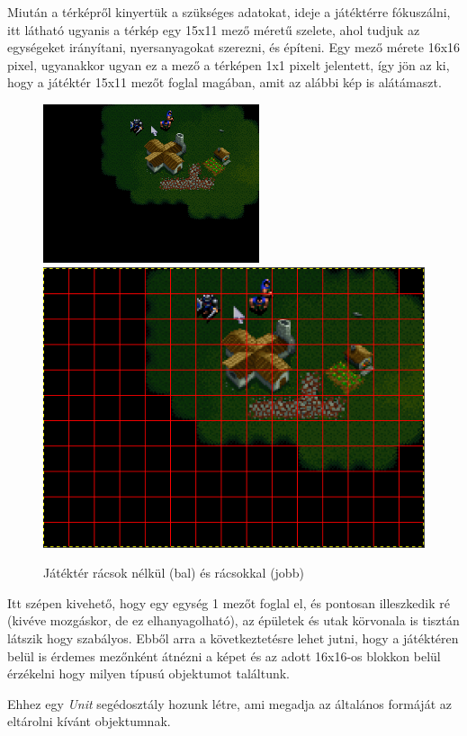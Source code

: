 Miután a térképről kinyertük a szükséges adatokat, ideje a játéktérre fókuszálni, itt látható ugyanis a térkép egy 15x11 mező méretű szelete, ahol tudjuk az egységeket irányítani, nyersanyagokat szerezni, és építeni.
Egy mező mérete 16x16 pixel, ugyanakkor ugyan ez a mező a térképen 1x1 pixelt jelentett, így jön az ki, hogy a játéktér 15x11 mezőt foglal magában, amit az alábbi kép is alátámaszt.
\begin{figure}[h]
    \centering
    \includegraphics[scale=0.8]{images/playArea.png}
    \includegraphics[scale=0.53]{images/playAreaRed.png}
    \caption{Játéktér rácsok nélkül (bal) és rácsokkal (jobb)}
    \label{fig:playArea}
\end{figure}

Itt szépen kivehető, hogy egy egység 1 mezőt foglal el, és pontosan illeszkedik ré (kivéve mozgáskor, de ez elhanyagolható), az épületek és utak körvonala is tisztán látszik hogy szabályos.
Ebből arra a következtetésre lehet jutni, hogy a játéktéren belül is érdemes mezőnként átnézni a képet és az adott 16x16-os blokkon belül érzékelni hogy milyen típusú objektumot találtunk.

Ehhez egy \textit{Unit} segédosztály hozunk létre, ami megadja az általános formáját az eltárolni kívánt objektumnak.

